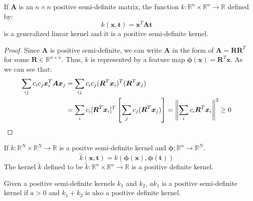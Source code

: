 \begin{proposition}
    If $\boldsymbol A$ is an $n\times n$ positive semi-definite matrix, the function $k : \mathbb{R}^n\times \mathbb{R}^n \rightarrow \mathbb{R}$ defined by:
    \begin{equation*}
        k(\boldsymbol x, \boldsymbol t) = \boldsymbol x^T\boldsymbol A\boldsymbol t
    \end{equation*}
    is a generalized linear kernel and it is a positive semi-definite kernel.
\end{proposition}
\begin{proof}
    Since $\boldsymbol A$ is positive semi-definite, we can write $\boldsymbol A$ in the form of $\boldsymbol A=\boldsymbol R\boldsymbol R^T$ for some $\boldsymbol R \in \mathbb{R}^{n\times n}$. Thus, $k$ is represented by a feature map $\boldsymbol \phi(\boldsymbol x) = \boldsymbol R^T\boldsymbol x$. As we can see that:
    \begin{equation*}
    \begin{aligned}
        \sum_{ij} c_ic_j\boldsymbol x_i^T\boldsymbol A\boldsymbol x_j &= \sum_{ij}c_ic_j(\boldsymbol R^T\boldsymbol x_i)^T(\boldsymbol R^T\boldsymbol x_j) \\
        &= \sum_i c_i[\boldsymbol R^T\boldsymbol x_i]^T\left[ \sum_j c_j(\boldsymbol R^T\boldsymbol x_j) \right] = \left\lVert\sum_i c_i\boldsymbol R^T\boldsymbol x_i\right\rVert^2 \ge 0
    \end{aligned}
    \end{equation*}
\end{proof}

\begin{proposition}
    If $k:\mathbb{R}^N\times \mathbb{R}^N\rightarrow \mathbb{R}$ is a positve semi-definite kernel and $\boldsymbol \phi: \mathbb{R}^n \rightarrow \mathbb{R}^N$. 
    \begin{equation*}
        \tilde{k}(\boldsymbol x, \boldsymbol t) = k(\boldsymbol \phi(\boldsymbol x), \boldsymbol \phi(\boldsymbol t))
    \end{equation*}
    The kernel $\tilde{k}$ defined to be $\tilde{k}:\mathbb{R}^n\times \mathbb{R}^n \rightarrow \mathbb{R}$ is a positive definite kernel.
\end{proposition}

\begin{proposition}
    Given a positive semi-definite kernels $k_1$ and $k_2$, $ak_1$ is a positive semi-definite kernel if $a>0$ and $k_1 + k_2$ is also a positive definite kernel.
\end{proposition}

